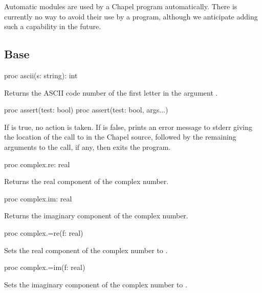 Automatic modules are used by a Chapel program automatically.  There
is currently no way to avoid their use by a program, although we
anticipate adding such a capability in the future.


\subsection{Base}
\label{Standard}

\begin{protohead}
proc ascii(s: string): int
\end{protohead}
\begin{protobody}
Returns the ASCII code number of the first letter in the
argument .
\end{protobody}

\begin{protohead}
proc assert(test: bool)
proc assert(test: bool, args...)
\end{protohead}
\begin{protobody}
If  is true, no action is taken.
If  is false,
prints an error message to stderr giving the location of the call to 
in the Chapel source, followed by the remaining arguments to the call, if any,
then exits the program.
\end{protobody}

\begin{protohead}
proc complex.re: real
\end{protohead}
\begin{protobody}
Returns the real component of the complex number.
\end{protobody}

\begin{protohead}
proc complex.im: real
\end{protohead}
\begin{protobody}
Returns the imaginary component of the complex number.
\end{protobody}

\begin{protohead}
proc complex.=re(f: real)
\end{protohead}
\begin{protobody}
Sets the real component of the complex number to .
\end{protobody}

\begin{protohead}
proc complex.=im(f: real)
\end{protohead}
\begin{protobody}
Sets the imaginary component of the complex number to .
\end{protobody}

